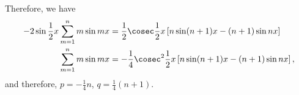 \begin{enumerate}
          Therefore, we have
          \begin{align*}
              -2 \sin \frac{1}{2} x \sum_{m = 1}^{n} m \sin mx & = \frac{1}{2} \cosec \frac{1}{2}x \left[n \sin(n + 1)x - (n + 1) \sin nx\right]      \\
              \sum_{m = 1}^{n} m \sin mx                       & = - \frac{1}{4} \cosec^2 \frac{1}{2}x \left[n \sin(n + 1)x - (n + 1) \sin nx\right],
          \end{align*}
          and therefore, \(p = -\frac{1}{4}n\), \(q = \frac{1}{4}(n + 1)\).
\end{enumerate}